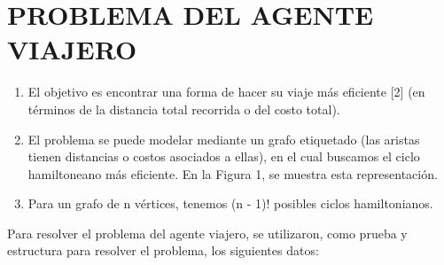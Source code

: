 \documentclass{article}
\begin{document}
\section{PROBLEMA DEL AGENTE VIAJERO}
    \begin{enumerate}
        \item El objetivo es encontrar una forma de hacer su viaje más eficiente [2] (en términos de la distancia total recorrida o del costo total).       
        
        \item El problema se puede modelar mediante un grafo etiquetado (las aristas tienen distancias o costos asociados a ellas), en el cual buscamos el ciclo hamiltoneano más eficiente. En la Figura 1, se muestra esta representación. 
        
        \item Para un grafo de n vértices, tenemos (n - 1)! posibles ciclos hamiltonianos.
    \end{enumerate}  

Para resolver el problema del agente viajero, se utilizaron, como prueba y estructura para resolver el problema, los siguientes datos:
    
\end{document}

